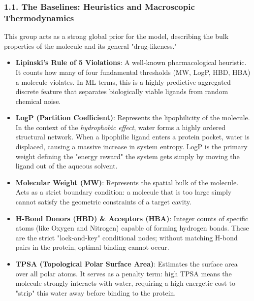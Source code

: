 \documentclass[11pt, a4paper]{article}
\begin{document}
\subsubsection*{1.1. The Baselines: Heuristics and Macroscopic Thermodynamics}
This group acts as a strong global prior for the model, describing the bulk properties of the molecule and its general "drug-likeness."
\begin{itemize}[leftmargin=*]
    \item \textbf{Lipinski's Rule of 5 Violations}: A well-known pharmacological heuristic. It counts how many of four fundamental thresholds
    (MW, LogP, HBD, HBA) a molecule violates. In ML terms, this is a highly predictive aggregated discrete feature that separates biologically
    viable ligands from random chemical noise.
    \item \textbf{LogP (Partition Coefficient)}: Represents the lipophilicity of the molecule. In the context of the \textit{hydrophobic effect},
    water forms a highly ordered structural network. When a lipophilic ligand enters a protein pocket, water is displaced, causing a massive
    increase in system entropy. LogP is the primary weight defining the "energy reward" the system gets simply by moving the ligand out of
    the aqueous solvent.
    \item \textbf{Molecular Weight (MW)}: Represents the spatial bulk of the molecule. Acts as a strict boundary condition: a molecule that is
    too large simply cannot satisfy the geometric constraints of a target cavity.
    \item \textbf{H-Bond Donors (HBD) \& Acceptors (HBA)}: Integer counts of specific atoms (like Oxygen and Nitrogen) capable of forming
    hydrogen bonds. These are the strict "lock-and-key" conditional nodes; without matching H-bond pairs in the protein, optimal binding cannot occur.
    \item \textbf{TPSA (Topological Polar Surface Area)}: Estimates the surface area over all polar atoms. It serves as a penalty term:
    high TPSA means the molecule strongly interacts with water, requiring a high energetic cost to "strip" this water away before binding to
    the protein.
\end{itemize}
\end{document}

